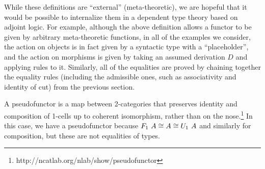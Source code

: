 \documentclass{drl-common/llncs}
\newcommand\F[2]{\ensuremath{F_{#1} \,\, #2}}
\newcommand\U[2]{\ensuremath{U_{#1} \,\, #2}}
\begin{document}
%
While these definitions are ``external'' (meta-theoretic), we are
hopeful that it would be possible to internalize them in a dependent
type theory based on adjoint logic.  For example, although the above
definition allows a functor to be given by arbitrary meta-theoretic
functions, in all of the examples we consider, the action on objects is
in fact given by a syntactic type with a ``placeholder'', and the action
on morphisms is given by taking an assumed derivation $D$ and applying
rules to it.  Similarly, all of the equalities are proved by chaining
together the equality rules (including the admissible ones, such as
associativity and identity of cut) from the previous section.

A pseudofunctor is a map between 2-categories that preserves identity
and composition of 1-cells up to coherent isomorphism, rather than on
the nose.\footnote{http://ncatlab.org/nlab/show/pseudofunctor} In this
case, we have a pseudofunctor because $\F 1 A \iso A \iso \U 1 A$ and
similarly for composition, but these are not equalities of types.
\end{document}
